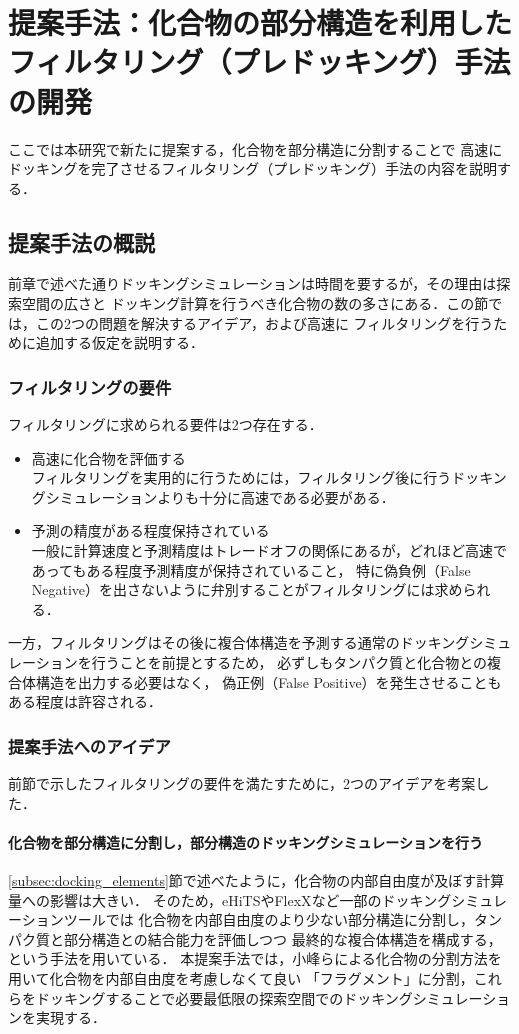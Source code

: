 \chapter{提案手法：化合物の部分構造を利用したフィルタリング（プレドッキング）手法の開発}
ここでは本研究で新たに提案する，化合物を部分構造に分割することで
高速にドッキングを完了させるフィルタリング（プレドッキング）手法の内容を説明する．

\section{提案手法の概説}
前章で述べた通りドッキングシミュレーションは時間を要するが，その理由は探索空間の広さと
ドッキング計算を行うべき化合物の数の多さにある．この節では，この2つの問題を解決するアイデア，および高速に
フィルタリングを行うために追加する仮定を説明する．

\subsection{フィルタリングの要件}\label{subsec}
フィルタリングに求められる要件は2つ存在する．
\begin{itemize}
\item 高速に化合物を評価する\\
	フィルタリングを実用的に行うためには，フィルタリング後に行うドッキングシミュレーションよりも十分に高速である必要がある．
\item 予測の精度がある程度保持されている\\
	一般に計算速度と予測精度はトレードオフの関係にあるが，どれほど高速であってもある程度予測精度が保持されていること，
	特に偽負例（False Negative）を出さないように弁別することがフィルタリングには求められる．
\end{itemize}
一方，フィルタリングはその後に複合体構造を予測する通常のドッキングシミュレーションを行うことを前提とするため，
必ずしもタンパク質と化合物との複合体構造を出力する必要はなく，
偽正例（False Positive）を発生させることもある程度は許容される．

\subsection{提案手法へのアイデア}\label{subsec:idea}
前節で示したフィルタリングの要件を満たすために，2つのアイデアを考案した．

\subsubsection{化合物を部分構造に分割し，部分構造のドッキングシミュレーションを行う}
\ref{subsec:docking_elements}節で述べたように，化合物の内部自由度が及ぼす計算量への影響は大きい．
そのため，eHiTS\cite{Zsoldos2007}やFlexX\cite{Rarey1996}など一部のドッキングシミュレーションツールでは
化合物を内部自由度のより少ない部分構造に分割し，タンパク質と部分構造との結合能力を評価しつつ
最終的な複合体構造を構成する，という手法を用いている．
本提案手法では，小峰ら\cite{Shunta2015}による化合物の分割方法を用いて化合物を内部自由度を考慮しなくて良い
「フラグメント」に分割，これらをドッキングすることで必要最低限の探索空間でのドッキングシミュレーションを実現する．

